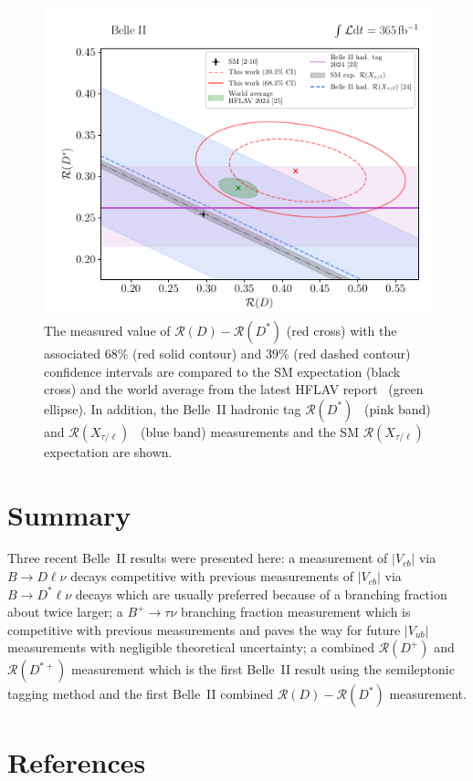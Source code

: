 \documentclass{moriond}
\def\vub{V_{ub}}
\def\vcb{V_{cb}}
\def\btodlnu{B \to D\ell\nu}
\def\btodstlnu{B \to D^*\ell\nu}
\def\rd{\mathcal{R}\left(D\right)}
\def\rdp{\mathcal{R}\left(D^+\right)}
\def\rdst{\mathcal{R}\left(D^*\right)}
\def\rdstp{\mathcal{R}\left(D^{*+}\right)}
\begin{document}
\begin{figure}[h!]
    \centering
    \includegraphics[scale=0.9]{rd_comp.pdf}
    \caption{The measured value of $\rd-\rdst$ (red cross) with the associated $68\%$ (red solid contour) and $39\%$ (red dashed contour) confidence intervals are compared to the SM expectation (black cross) and the world average from the latest HFLAV report~\cite{hflav} (green ellipse). In addition, the Belle~II hadronic tag $\rdst$~\cite{kojima} (pink band) and $\mathcal{R}(X_{\tau/\ell})$~\cite{henrik} (blue band) measurements and the SM $\mathcal{R}(X_{\tau/\ell})$ expectation are shown.}
    \label{fig:rd_comp}
\end{figure}

\section{Summary}
Three recent Belle~II results were presented here: a measurement of $|\vcb|$ via $\btodlnu$ decays competitive with previous measurements of $|\vcb|$ via $\btodstlnu$ decays which are usually preferred because of a branching fraction about twice larger; a $B^+ \to \tau\nu$ branching fraction measurement which is competitive with previous measurements and paves the way for future $|\vub|$ measurements with negligible theoretical uncertainty; a combined $\rdp$ and $\rdstp$ measurement which is the first Belle~II result using the semileptonic tagging method and the first Belle~II combined $\rd-\rdst$ measurement.


\section*{References}
\end{document}
